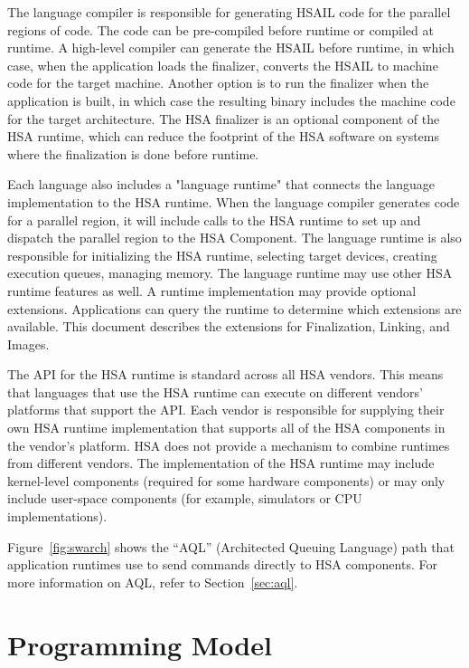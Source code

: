 \documentclass[final,oneside]{book}
\begin{document}
The language compiler is responsible for generating HSAIL code for the parallel
regions of code. The code can be pre-compiled before runtime or compiled at
runtime. A high-level compiler can generate the HSAIL before runtime, in which
case, when the application loads the finalizer, converts the HSAIL to machine
code for the target machine. Another option is to run the finalizer when the
application is built, in which case the resulting binary includes the machine
code for the target architecture. The HSA finalizer is an optional component of
the HSA runtime, which can reduce the footprint of the HSA software on systems
where the finalization is done before runtime.

Each language also includes a "language runtime" that connects the language
implementation to the HSA runtime. When the language compiler generates code for
a parallel region, it will include calls to the HSA runtime to set up and
dispatch the parallel region to the HSA Component. The language runtime is also
responsible for initializing the HSA runtime, selecting target devices, creating
execution queues, managing memory. The language runtime may use other HSA
runtime features as well. A runtime implementation may provide optional
extensions. Applications can query the runtime to determine which extensions are
available. This document describes the extensions for Finalization, Linking, and
Images.

The API for the HSA runtime is standard across all HSA vendors. This means that
languages that use the HSA runtime can execute on different vendors' platforms
that support the API. Each vendor is responsible for supplying their own HSA
runtime implementation that supports all of the HSA components in the vendor's
platform. HSA does not provide a mechanism to combine runtimes from different
vendors. The implementation of the HSA runtime may include kernel-level
components (required for some hardware components) or may only include
user-space components (for example, simulators or CPU implementations).

Figure~\ref{fig:swarch} shows the ``AQL'' (Architected Queuing
Language) path that application runtimes use to send commands directly to
HSA components. For more information on AQL, refer to Section~\ref{sec:aql}.


\section{Programming Model}\label{sec:executionmodel}
\end{document}
